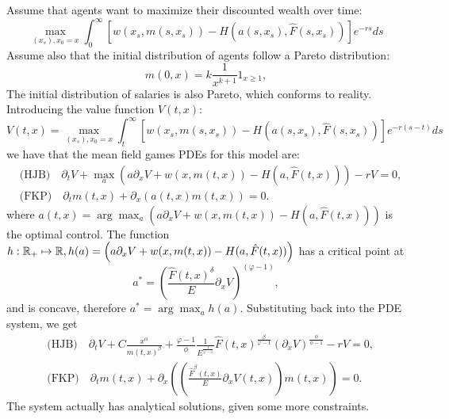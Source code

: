 \documentclass{article}
\begin{document}
Assume that agents want to maximize their discounted wealth over time:
\begin{equation}
    \max_{(x_s), x_0 = x} \int_0^\infty [w(x_s, m(s,x_s)) - H(a(s,x_s), \hat F(s,x_s))] e^{-rs} ds
\end{equation}
Assume also that the initial distribution of agents follow a Pareto distribution:
\begin{equation}
    m(0,x) = k\frac{1}{x^{k+1}} 1_{x \geq 1},
\end{equation}
The initial distribution of salaries is also Pareto, which conforms to reality.
Introducing the value function $V(t,x)$:
\begin{equation}
   V(t,x) = \max_{(x_s), x_0 = x} \int_t^\infty [w(x_s, m(s,x_s)) - H(a(s,x_s), \hat F(s,x_s))] e^{-r(s-t)} ds
\end{equation}
we have that the mean field games PDEs for this model are:
\begin{equation}
    \begin{split}
        &\text{(HJB)}\quad \partial_t V + \max_a\left(a\partial_x V + w(x, m(t,x)) - H(a, \hat F(t,x)) \right) - rV = 0,\\
        &\text{(FKP)}\quad \partial_t m(t,x) + \partial_x( a(t,x) m(t,x)) = 0.
    \end{split} 
\end{equation}
where $a(t,x) = \arg\max_a \left( a \partial_x V + w(x,m(t,x)) - H(a, \hat F(t,x)) \right)$ is the optimal control.
The function $h: \mathbb{R}_+ \mapsto \mathbb{R}, h(a) = \left( a \partial_x V + w(x,m(t,x)) - H(a, \hat F(t,x)) \right)$ has a critical point at 
$$a^* = \left(\frac{\hat F(t,x)^\delta}{E} \partial_x V\right)^{(\varphi - 1)},$$
and is concave, therefore $a^* = \arg\max_a h(a)$. Substituting back into the PDE system, we get
\begin{equation}
    \begin{split}
        &\text{(HJB)}\quad \partial_t V + C \frac{x^\alpha}{m(t,x)^\beta} + \frac{\varphi - 1}{\phi} \frac{1}{E^{\frac{1}{\varphi - 1}}} {\hat F}(t,x)^{\frac{\beta}{\varphi - 1}} (\partial_x V)^{\frac{\phi}{\phi - 1}} - rV = 0,\\
        &\text{(FKP)}\quad \partial_t m(t,x) + \partial_x\left( \left( \frac{\hat F^\beta(t,x)}{E} \partial_x V(t,x)\right) m(t,x)\right) = 0.
    \end{split}
\end{equation}
The system actually has analytical solutions, given some more constraints.
\end{document}
